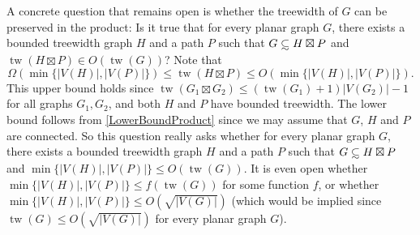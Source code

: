 \documentclass{patmorin}
\renewcommand{\leq}{\leqslant}
\DeclareMathOperator{\tw}{tw}
\theoremstyle{plain}
\theoremstyle{definition}
\let\oldsubset\subset
\newcommand{\subsetsim}{\mathrel{\ooalign{\raise0.175ex\hbox{$\oldsubset$}\cr\hidewidth\raise-0.9ex\hbox{\scalebox{0.9}{$\sim$}}\hidewidth\cr}}}
\begin{document}
A concrete question that remains open is whether the treewidth of $G$ can be preserved in the product:
Is it true that for every planar graph $G$, there exists a bounded treewidth graph $H$ and a path $P$ such that $G\subsetsim H\boxtimes P$ and $\tw(H\boxtimes P) \in O(\tw(G))$? Note that 
$$\Omega(\min\{|V(H)|,|V(P)|\})\leq  \tw( H\boxtimes P) \leq O(\min\{|V(H)|,|V(P)|\}).$$ 
This upper bound holds since $\tw(G_1\boxtimes G_2)\leq (\tw(G_1)+1)|V(G_2)|-1$ for all graphs $G_1,G_2$, and both $H$ and $P$ have bounded treewidth. The lower bound follows from \eqref{LowerBoundProduct} since we may assume that $G$, $H$ and $P$ are connected. So this question really asks whether for every planar graph $G$, there exists a bounded treewidth graph $H$ and a path $P$ such that $G\subsetsim H\boxtimes P$ and $\min\{|V(H)|,|V(P)|\} \leq O(\tw(G))$. It is even open whether $\min\{|V(H)|,|V(P)|\} \leq f(\tw(G))$ for some function $f$, or whether $\min\{|V(H)|,|V(P)|\} \leq O(\sqrt{|V(G)|})$ (which would be implied since $\tw(G) \leq O(\sqrt{|V(G)|})$ for every planar graph $G$).

{\fontsize{10pt}{11pt}\selectfont

}
\end{document}
